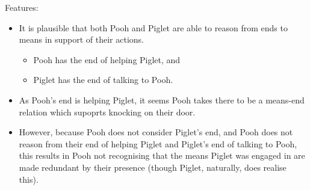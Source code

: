 \documentclass[10pt]{article}
\newcommand{\hozlinedash}[0]{%
  \noindent\hdashrule[0.5ex][c]{\textwidth}{.1pt}{2.5pt}
}
\begin{document}
Features:
\begin{itemize}[noitemsep]
\item It is plausible that both Pooh and Piglet are able to reason from ends to means in support of their actions.
  \begin{itemize}[noitemsep]
  \item Pooh has the end of helping Piglet, and
  \item Piglet has the end of talking to Pooh.
  \end{itemize}
\item As Pooh's end is helping Piglet, it seems Pooh takes there to be a means-end relation which supoprts knocking on their door.
\item However, because Pooh does not consider Piglet's end, and Pooh does not reason from their end of helping Piglet and Piglet's end of talking to Pooh, this results in Pooh not recognising that the means Piglet was engaged in are made redundant by their presence (though Piglet, naturally, does realise this).
\end{itemize}







\newpage


\printbibliography






\end{document}
